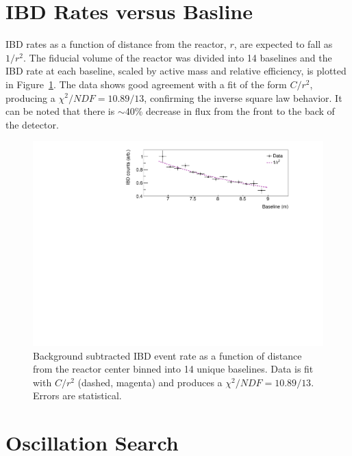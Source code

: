 \section{IBD Rates versus Basline}

IBD rates as a function of distance from the reactor, $r$, are expected to fall as $1/r^2$. 
The fiducial volume of the reactor was divided into 14 baselines and the IBD rate at each baseline, scaled by active mass and relative efficiency, is plotted in Figure~\ref{fig:ibdvsbaseline}.
The data shows good agreement with a fit of the form $C/r^2$, producing a $\chi^2/NDF = 10.89/13$, confirming the inverse square law behavior. 
It can be noted that there is $\sim$40\% decrease in flux from the front to the back of the detector. 

\begin{figure}[H]
	\centering
	\includegraphics[width=1\linewidth]{tex/7-oscillation-images/IBDvsBaseline}
	\caption{Background subtracted IBD event rate as a function of distance from the reactor center binned into 14 unique baselines. Data is fit with $C/r^2$ (dashed, magenta) and produces a $\chi^2/NDF = 10.89/13$. Errors are statistical.}
	\label{fig:ibdvsbaseline}
\end{figure}



\section{Oscillation Search}

